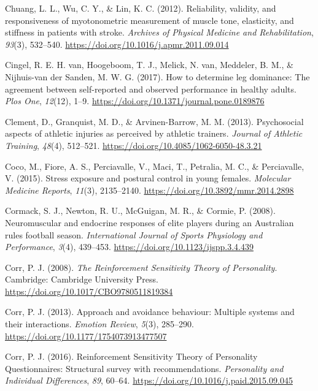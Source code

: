 \documentclass[
  english,
  man,floatsintext]{apa6}
\begin{document}
\leavevmode\hypertarget{ref-Chuang2012}{}%
Chuang, L. L., Wu, C. Y., \& Lin, K. C. (2012). Reliability, validity, and responsiveness of myotonometric measurement of muscle tone, elasticity, and stiffness in patients with stroke. \emph{Archives of Physical Medicine and Rehabilitation}, \emph{93}(3), 532--540. \url{https://doi.org/10.1016/j.apmr.2011.09.014}

\leavevmode\hypertarget{ref-VanCingel2017}{}%
Cingel, R. E. H. van, Hoogeboom, T. J., Melick, N. van, Meddeler, B. M., \& Nijhuis-van der Sanden, M. W. G. (2017). How to determine leg dominance: The agreement between self-reported and observed performance in healthy adults. \emph{Plos One}, \emph{12}(12), 1--9. \url{https://doi.org/10.1371/journal.pone.0189876}

\leavevmode\hypertarget{ref-Clement2013}{}%
Clement, D., Granquist, M. D., \& Arvinen-Barrow, M. M. (2013). Psychosocial aspects of athletic injuries as perceived by athletic trainers. \emph{Journal of Athletic Training}, \emph{48}(4), 512--521. \url{https://doi.org/10.4085/1062-6050-48.3.21}

\leavevmode\hypertarget{ref-Coco2015}{}%
Coco, M., Fiore, A. S., Perciavalle, V., Maci, T., Petralia, M. C., \& Perciavalle, V. (2015). Stress exposure and postural control in young females. \emph{Molecular Medicine Reports}, \emph{11}(3), 2135--2140. \url{https://doi.org/10.3892/mmr.2014.2898}

\leavevmode\hypertarget{ref-Cormack2008}{}%
Cormack, S. J., Newton, R. U., McGuigan, M. R., \& Cormie, P. (2008). Neuromuscular and endocrine responses of elite players during an Australian rules football season. \emph{International Journal of Sports Physiology and Performance}, \emph{3}(4), 439--453. \url{https://doi.org/10.1123/ijspp.3.4.439}

\leavevmode\hypertarget{ref-Corr2008}{}%
Corr, P. J. (2008). \emph{The Reinforcement Sensitivity Theory of Personality}. Cambridge: Cambridge University Press. \url{https://doi.org/10.1017/CBO9780511819384}

\leavevmode\hypertarget{ref-Corr2013}{}%
Corr, P. J. (2013). Approach and avoidance behaviour: Multiple systems and their interactions. \emph{Emotion Review}, \emph{5}(3), 285--290. \url{https://doi.org/10.1177/1754073913477507}

\leavevmode\hypertarget{ref-Corr2016a}{}%
Corr, P. J. (2016). Reinforcement Sensitivity Theory of Personality Questionnaires: Structural survey with recommendations. \emph{Personality and Individual Differences}, \emph{89}, 60--64. \url{https://doi.org/10.1016/j.paid.2015.09.045}
\end{document}
